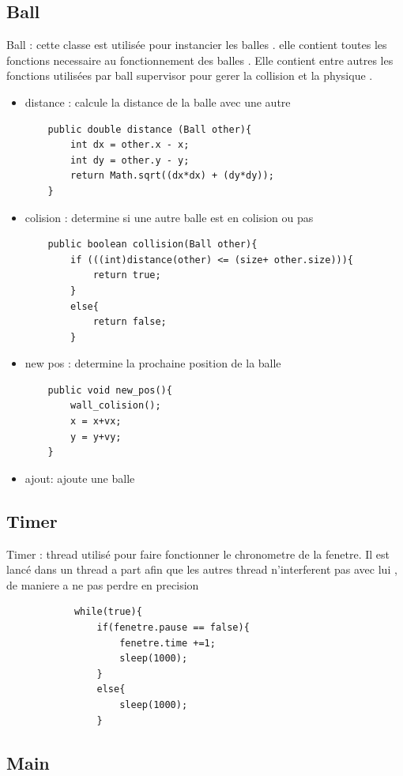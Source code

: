 \documentclass{report}
\begin{document}
\subsection{Ball }

Ball : cette classe est utilisée pour instancier les balles . elle contient toutes les fonctions necessaire au fonctionnement des balles . Elle contient entre autres les fonctions utilisées par ball supervisor pour gerer la collision et la physique . 
\begin{itemize}
\item distance : calcule la distance de la balle avec une autre
\begin{verbatim}
	public double distance (Ball other){
		int dx = other.x - x;
		int dy = other.y - y;
		return Math.sqrt((dx*dx) + (dy*dy));
	}
\end{verbatim}
\item colision : determine si une autre balle est en colision ou pas
\begin{verbatim}
	public boolean collision(Ball other){
		if (((int)distance(other) <= (size+ other.size))){
			return true;
		}
		else{
			return false;
		}
\end{verbatim}
\item new pos : determine la prochaine position de la balle
\begin{verbatim}
	public void new_pos(){
		wall_colision();
		x = x+vx;
		y = y+vy;
	}
\end{verbatim}
\item ajout: ajoute une balle
\end{itemize}
\subsection{Timer}

Timer : thread utilisé pour faire fonctionner le chronometre de la fenetre. Il est lancé dans un thread a part afin que les autres thread n'interferent pas avec lui , de maniere a ne pas perdre en precision

\begin{verbatim}
			while(true){
				if(fenetre.pause == false){
					fenetre.time +=1;
					sleep(1000);
				}
				else{
					sleep(1000);
				}
\end{verbatim}



\subsection{Main}
\end{document}
